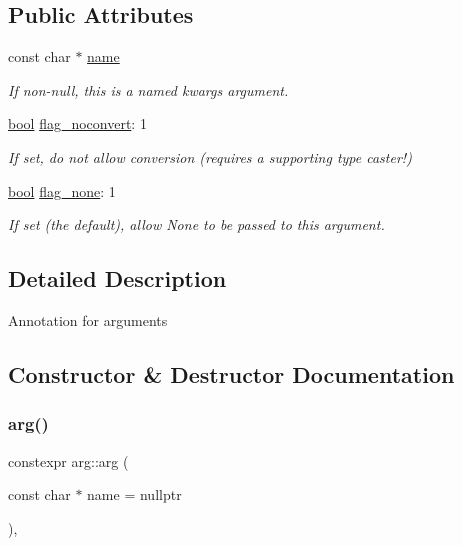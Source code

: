 \subsection*{Public Attributes}
\begin{DoxyCompactItemize}
\item 
const char $\ast$ \mbox{\hyperlink{structarg_a19d6eebdcc5e2c4679c5f77760adb5dc}{name}}
\begin{DoxyCompactList}\small\item\em If non-\/null, this is a named kwargs argument. \end{DoxyCompactList}\item 
\mbox{\hyperlink{asdl_8h_af6a258d8f3ee5206d682d799316314b1}{bool}} \mbox{\hyperlink{structarg_af69a71cd0c34cbce3ef8705e7b7da817}{flag\+\_\+noconvert}}\+: 1
\begin{DoxyCompactList}\small\item\em If set, do not allow conversion (requires a supporting type caster!) \end{DoxyCompactList}\item 
\mbox{\hyperlink{asdl_8h_af6a258d8f3ee5206d682d799316314b1}{bool}} \mbox{\hyperlink{structarg_a57121005d089a7b05536d320ebc9d32f}{flag\+\_\+none}}\+: 1
\begin{DoxyCompactList}\small\item\em If set (the default), allow None to be passed to this argument. \end{DoxyCompactList}\end{DoxyCompactItemize}


\subsection{Detailed Description}
Annotation for arguments 

\subsection{Constructor \& Destructor Documentation}
\mbox{\label{structarg_ae6211325dd7551f254b0428f9e1e4e4c}} 
\subsubsection{\texorpdfstring{arg()}{arg()}}
{\footnotesize\ttfamily constexpr arg\+::arg (\begin{DoxyParamCaption}\item[{const char $\ast$}]{name = {\ttfamily nullptr} }\end{DoxyParamCaption})\hspace{0.3cm}{\ttfamily [inline]}, {\ttfamily [explicit]}}



